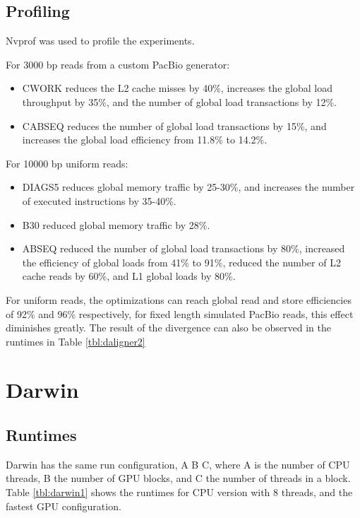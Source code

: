 \documentclass[../main/thesis.tex]{subfiles}
\begin{document}
\subsection{Profiling}
Nvprof \cite{nvprof} was used to profile the experiments.

For 3000 bp reads from a custom PacBio generator:
\begin{itemize}
\item CWORK reduces the L2 cache misses by 40\%, increases the global load throughput by 35\%, and the number of global load transactions by 12\%. \vspace{-10pt}
\item CABSEQ reduces the number of global load transactions by 15\%, and increases the global load efficiency from 11.8\% to 14.2\%.
\end{itemize}

For 10000 bp uniform reads:
\begin{itemize}
\item DIAGS5 reduces global memory traffic by 25-30\%, and increases the number of executed instructions by 35-40\%. \vspace{-10pt}
\item B30 reduced global memory traffic by 28\%. \vspace{-10pt}
\item ABSEQ reduced the number of global load transactions by 80\%, increased the efficiency of global loads from 41\% to 91\%, reduced the number of L2 cache reads by 60\%, and L1 global loads by 80\%.
\end{itemize}

For uniform reads, the optimizations can reach global read and store efficiencies of 92\% and 96\% respectively, for fixed length simulated PacBio reads, this effect diminishes greatly.
The result of the divergence can also be observed in the runtimes in Table \ref{tbl:daligner2}


\section{Darwin}
\subsection{Runtimes}
Darwin has the same run configuration, A B C, where A is the number of CPU threads, B the number of GPU blocks, and C the number of threads in a block.
Table \ref{tbl:darwin1} shows the runtimes for CPU version with 8 threads, and the fastest GPU configuration.
\end{document}
